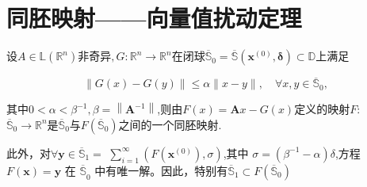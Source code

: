 \documentclass{lzureport}
\begin{document}
\section{同胚映射——向量值扰动定理}
设$A\in\mathbb{L}\left(\mathbb{R}^n\right)$非奇异$,G:\mathbb{R}^n\to\mathbb{R}^n$在闭球$\overline{\mathbb{S}}_0=\overline{\mathbb{S}}\left(\boldsymbol{x}^{(0)},\boldsymbol{\delta}\right)\subset \mathbb{D}$上满足

$$\|G(x)-G(y)\|\leqslant\alpha\|x-y\|,\quad\forall x,y\in\overline{\mathbb{S}}_0,$$

其中$0<\alpha<\beta^{-1},\beta=\left\|\boldsymbol{A}^{-1}\right\|$,则由$F(x)=\boldsymbol{A}x-G(x)$定义的映射$F:$ $\overline{\mathbb{S}}_0\to\mathbb{R}^n$是$\overline{\mathbb{S}}_0$与$F\left(\overline{\mathbb{S}}_0\right)$之间的一个同胚映射.

此外，对$\forall\boldsymbol{y}\in\overline{\mathbb{S}}_1=$ $\sum\limits_{i=1}^{\infty}\left(F\left(\boldsymbol{x}^{(0)}\right),\sigma\right)$,其中 $\sigma=\left(\beta^{-1}-\alpha\right)\delta$,方程 $F(\boldsymbol{x})=\boldsymbol{y\text{ 在 }\overline{\mathbb{S}}}_0$ 中有唯一解。因此，特别有$\overline{\mathbb{S}}_1\subset F\left(\overline{\mathbb{S}}_0\right)$
\end{document}
